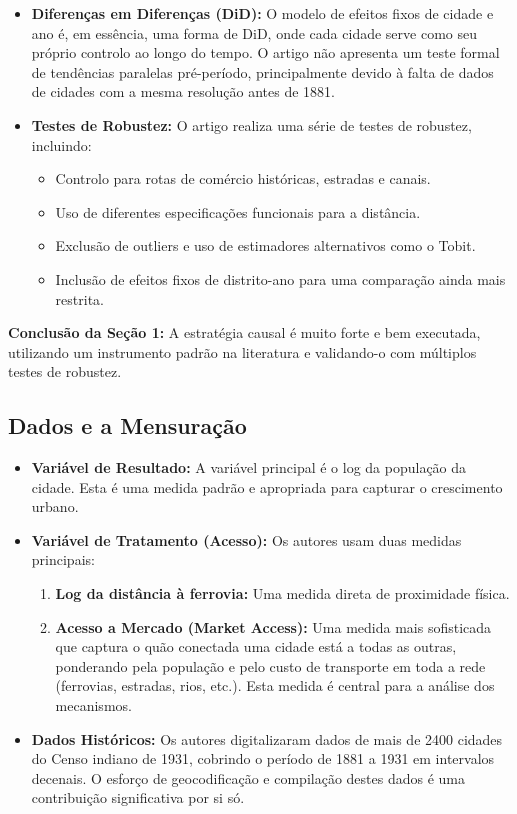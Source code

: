 \documentclass[12pt, a4paper]{article}
\begin{document}
\begin{itemize}
    \item \textbf{Diferenças em Diferenças (DiD):} O modelo de efeitos fixos de cidade e ano é, em essência, uma forma de DiD, onde cada cidade serve como seu próprio controlo ao longo do tempo. O artigo não apresenta um teste formal de tendências paralelas pré-período, principalmente devido à falta de dados de cidades com a mesma resolução antes de 1881.

    \item \textbf{Testes de Robustez:} O artigo realiza uma série de testes de robustez, incluindo:
    \begin{itemize}
        \item Controlo para rotas de comércio históricas, estradas e canais.
        \item Uso de diferentes especificações funcionais para a distância.
        \item Exclusão de outliers e uso de estimadores alternativos como o Tobit.
        \item Inclusão de efeitos fixos de distrito-ano para uma comparação ainda mais restrita.
    \end{itemize}
\end{itemize}

\noindent\textbf{Conclusão da Seção 1:} A estratégia causal é muito forte e bem executada, utilizando um instrumento padrão na literatura e validando-o com múltiplos testes de robustez.

\subsection{Dados e a Mensuração}
\begin{itemize}
    \item \textbf{Variável de Resultado:} A variável principal é o log da população da cidade. Esta é uma medida padrão e apropriada para capturar o crescimento urbano.
    \item \textbf{Variável de Tratamento (Acesso):} Os autores usam duas medidas principais:
        \begin{enumerate}
            \item \textbf{Log da distância à ferrovia:} Uma medida direta de proximidade física.
            \item \textbf{Acesso a Mercado (Market Access):} Uma medida mais sofisticada que captura o quão conectada uma cidade está a todas as outras, ponderando pela população e pelo custo de transporte em toda a rede (ferrovias, estradas, rios, etc.). Esta medida é central para a análise dos mecanismos.
        \end{enumerate}
    \item \textbf{Dados Históricos:} Os autores digitalizaram dados de mais de 2400 cidades do Censo indiano de 1931, cobrindo o período de 1881 a 1931 em intervalos decenais. O esforço de geocodificação e compilação destes dados é uma contribuição significativa por si só.
\end{itemize}
\end{document}

